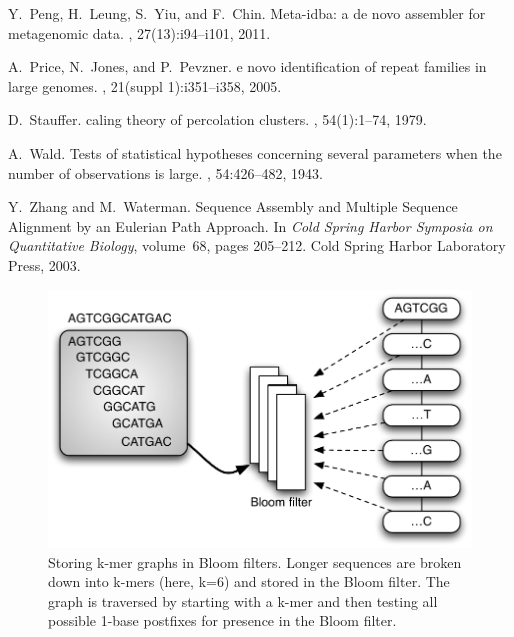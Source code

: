 \documentclass{pnastwo}
\begin{document}
\begin{article}
\begin{thebibliography}{10}
Y.~Peng, H.~Leung, S.~Yiu, and F.~Chin.
\newblock Meta-idba: a de novo assembler for metagenomic data.
, 27(13):i94--i101, 2011.

A.~Price, N.~Jones, and P.~Pevzner.
e novo identification of repeat families in large genomes.
, 21(suppl 1):i351--i358, 2005.

D.~Stauffer.
caling theory of percolation clusters.
, 54(1):1--74, 1979.

A.~Wald.
\newblock Tests of statistical hypotheses concerning several parameters when
  the number of observations is large.
, 54:426--482,
  1943.

Y.~Zhang and M.~Waterman.
 {S}equence {A}ssembly and {M}ultiple {S}equence {A}lignment
  by an {E}ulerian {P}ath {A}pproach.
\newblock In {\em Cold Spring Harbor Symposia on Quantitative Biology},
  volume~68, pages 205--212. Cold Spring Harbor Laboratory Press, 2003.

\end{thebibliography}

\end{article}

\begin{figure}
\centering
\includegraphics[width=5in]{bloomgraph}
\caption{Storing k-mer graphs in Bloom filters.  Longer sequences are broken down into k-mers (here, k=6) and stored in the Bloom filter.
The graph is traversed by starting with a k-mer and then testing all possible 1-base postfixes for presence in the Bloom filter.}

\label{fig:bloomgraph}
\end{figure}
\end{document}
